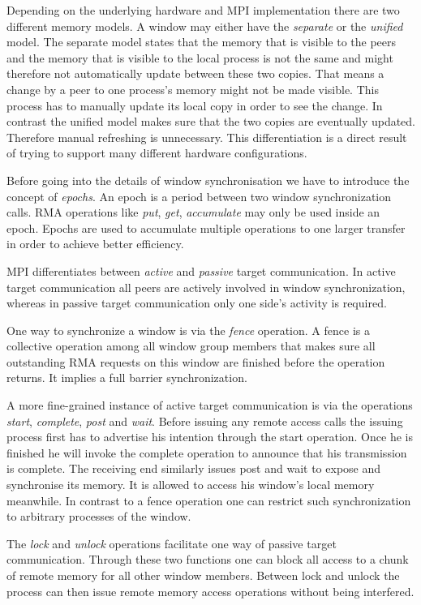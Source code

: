 \documentclass[a4paper, 10pt]{article}
\begin{document}
Depending on the underlying hardware and MPI implementation there are two different memory models. A window may either have the \emph{separate} or the \emph{unified} model. The separate model states that the memory that is visible to the peers and the memory that is visible to the local process is not the same and might therefore not automatically update between these two copies. That means a change by a peer to one process's memory might not be made visible. This process has to manually update its local copy in order to see the change. In contrast the unified model makes sure that the two copies are eventually updated. Therefore manual refreshing is unnecessary. This differentiation is a direct result of trying to support many different hardware configurations.

Before going into the details of window synchronisation we have to introduce the concept of \emph{epochs}. An epoch is a period between two window synchronization calls. RMA operations like \emph{put}, \emph{get}, \emph{accumulate} may only be used inside an epoch. Epochs are used to accumulate multiple operations to one larger transfer in order to achieve better efficiency.

MPI differentiates between \emph{active} and \emph{passive} target communication. In active target communication all peers are actively involved in window synchronization, whereas in passive target communication only one side's activity is required.

One way to synchronize a window is via the \emph{fence} operation. A fence is a collective operation among all window group members that makes sure all outstanding RMA requests on this window are finished before the operation returns. It implies a full barrier synchronization.

A more fine-grained instance of active target communication is via the operations \emph{start}, \emph{complete}, \emph{post} and \emph{wait}. Before issuing any remote access calls the issuing process first has to advertise his intention through the start operation. Once he is finished he will invoke the complete operation to announce that his transmission is complete. The receiving end similarly issues post and wait to expose and synchronise its memory. It is allowed to access his window's local memory meanwhile. In contrast to a fence operation one can restrict such synchronization to arbitrary processes of the window.

The \emph{lock} and \emph{unlock} operations facilitate one way of passive target communication. Through these two functions one can block all access to a chunk of remote memory for all other window members. Between lock and unlock the process can then issue remote memory access operations without being interfered.
\end{document}
